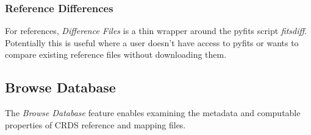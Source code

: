 \documentclass[letterpaper,10pt,english]{sphinxmanual}
\begin{document}
\begin{figure}[htbp]
\centering

\end{figure}


\subsubsection{Reference Differences}
\label{web_site_use:reference-differences}
For references,  \emph{Difference Files} is a thin wrapper around the pyfits
script \emph{fitsdiff}.   Potentially this is useful where a user doesn't have access
to pyfits or wants to compare existing reference files without downloading them.


\subsection{Browse Database}
\label{web_site_use:browse-database}
The \emph{Browse Database} feature enables examining the metadata and computable
properties of CRDS reference and mapping files.
\begin{figure}[htbp]
\centering

\end{figure}
\end{document}
